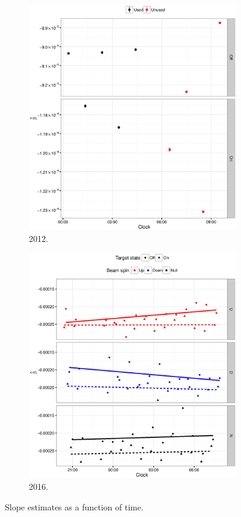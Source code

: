 \documentclass[reprint]{revtex4-1}
\newcommand{\scl}{.4}
\begin{document}
\begin{figure}
	\centering
\begin{subfigure}{.5\textwidth}
	\includegraphics[scale=\scl]{img/Slopes-2012_big.eps}
	\caption{2012.}
\end{subfigure}
\begin{subfigure}{.5\textwidth}
	\includegraphics[scale=\scl]{img/Slopes2016_VS_Clock.eps}
	\caption{2016.}
\end{subfigure}
\caption{Slope estimates as a function of time.\label{fig:SlopesVsTime}}
\end{figure}
\end{document}
